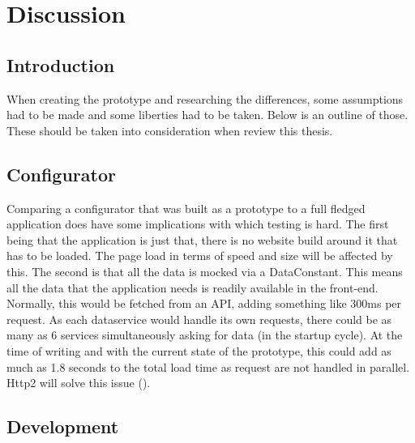 \chapter{Discussion}
\label{chapter:discussion}
\section{Introduction}
When creating the prototype and researching the differences, some assumptions had to be made and some liberties had to be taken. Below is an outline of those. These should be taken into consideration when review this thesis.

\section{Configurator}
Comparing a configurator that was built as a prototype to a full fledged application does have some implications with which testing is hard. The first being that the application is just that, there is no website build around it that has to be loaded. The page load in terms of speed and size will be affected by this. The second is that all the data is mocked via a DataConstant. This means all the data that the application needs is readily available in the front-end. Normally, this would be fetched from an API, adding something like 300ms per request. As each dataservice would handle its own requests, there could be as many as 6 services simultaneously asking for data (in the startup cycle). At the time of writing and with the current state of the prototype, this could add as much as 1.8 seconds to the total load time as request are not handled in parallel. Http2 will solve this issue (\cite{latency}).\newline


\section{Development}
